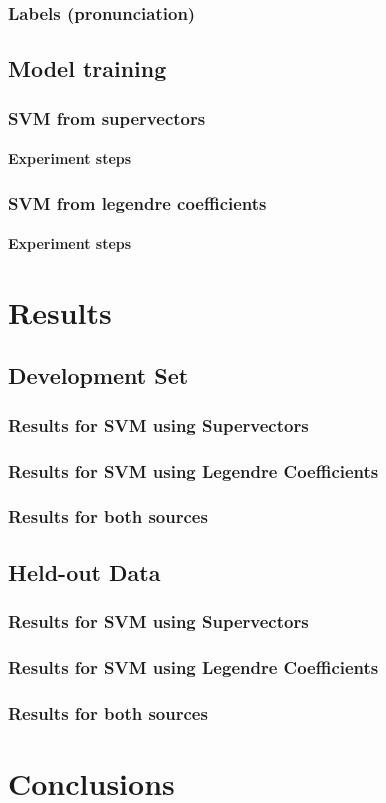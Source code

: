 \documentclass[11pt,a4paper]{tesis}
\begin{document}
		\subsection{Labels (pronunciation)}
			
	\section{Model training}
		\subsection{SVM from supervectors}
			\subsubsection{Experiment steps}
				
		\subsection{SVM from legendre coefficients}
			\subsubsection{Experiment steps}
				

\chapter{Results}
	\section{Development Set}
		\subsection{Results for SVM using Supervectors}
			
		\subsection{Results for SVM using Legendre Coefficients}
			
		\subsection{Results for both sources}
			
	\section{Held-out Data}
		\subsection{Results for SVM using Supervectors}
		\subsection{Results for SVM using Legendre Coefficients}
		\subsection{Results for both sources}
\chapter{Conclusions}
 
\end{document}
